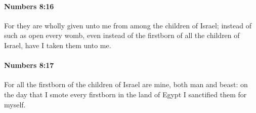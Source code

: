 		\paragraph{Numbers 8:16} %
			\label{NUMBERS-8-16}

			For they are wholly given unto me from among the children of Israel; instead of such as open every womb, even instead of the firstborn of all the children of Israel, have I taken them unto me.


		\paragraph{Numbers 8:17} %
			\label{NUMBERS-8-17}

			For all the firstborn of the children of Israel are mine, both man and beast: on the day that I smote every firstborn in the land of Egypt I sanctified them for myself.


